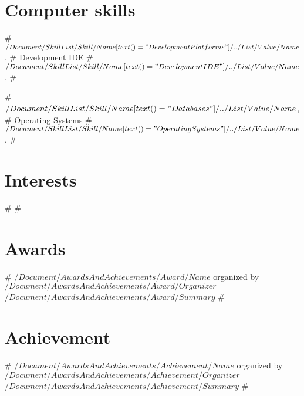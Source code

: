 \documentclass[11pt,a4paper,sans]{moderncv}   %
\begin{document}
\section{Computer skills}
{#$/Document/SkillList/Skill/Name[text()="Development Platforms"]/../List/Value/Name$, #}
{Development IDE}
{#$/Document/SkillList/Skill/Name[text()="Development IDE"]/../List/Value/Name$, #}

{#$/Document/SkillList/Skill/Name[text()="Databases"]/../List/Value/Name$, #}
{Operating Systems}
{#$/Document/SkillList/Skill/Name[text()="Operating Systems"]/../List/Value/Name$, #}


\section{Interests}
#
#

\section{Awards}
#
{$/Document/AwardsAndAchievements/Award/Name$ organized by $/Document/AwardsAndAchievements/Award/Organizer$}
{$/Document/AwardsAndAchievements/Award/Summary$}
#

\section{Achievement}
#
{$/Document/AwardsAndAchievements/Achievement/Name$ organized by $/Document/AwardsAndAchievements/Achievement/Organizer$}
{$/Document/AwardsAndAchievements/Achievement/Summary$}
#




%
\end{document}
